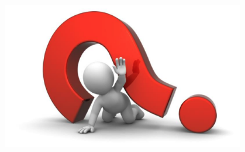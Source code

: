 \documentclass{beamer} %
\begin{document}
\begin{frame}
\begin{center}
\includegraphics[width=0.8\textwidth]{img/question}
\end{center}

\end{frame}






\end{document}
